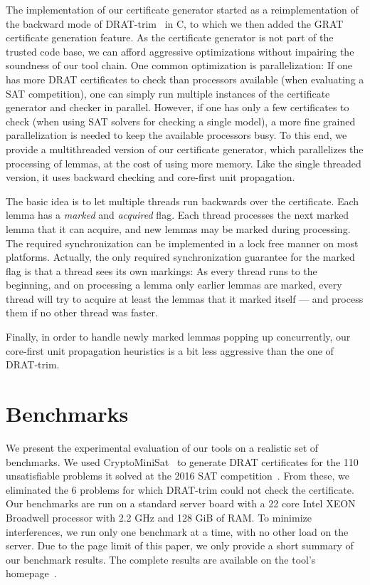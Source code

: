 \documentclass{llncs}
\newcommand\CC{C\nolinebreak[4]\hspace{-.05em}\raisebox{.4ex}{\relsize{-3}{\textbf{++}}}}
\begin{document}
The implementation of our certificate generator started as a reimplementation of the backward mode of DRAT-trim~\cite{WHH13,drat-trim-webpage} in \CC, to 
which we then added the GRAT certificate generation feature. 
As the certificate generator is not part of the trusted code base, we can afford aggressive optimizations without impairing the soundness of our tool chain.
One common optimization is parallelization: If one has more DRAT certificates to check than processors 
available (\eg when evaluating a SAT competition), one can simply run multiple instances of the certificate generator and checker in parallel.
However, if one has only a few certificates to check (\eg when using SAT solvers for checking a single model), a more fine grained parallelization 
is needed to keep the available processors busy. To this end, we provide a multithreaded version of our certificate generator, 
which parallelizes the processing of lemmas, at the cost of using more memory. Like the single threaded version, it uses backward checking and 
core-first unit propagation.

The basic idea is to let multiple threads run backwards over the certificate. Each lemma has a \emph{marked} and \emph{acquired} flag. 
Each thread processes the next marked lemma that it can acquire, and new lemmas may be marked during processing.
The required synchronization can be implemented in a lock free manner on most platforms. 
Actually, the only required synchronization guarantee for the marked flag is that a thread sees its own markings:
As every thread runs to the beginning, 
and on processing a lemma only earlier lemmas are marked, every thread will try to acquire at least the lemmas that it marked itself --- and 
process them if no other thread was faster. 

Finally, in order to handle newly marked lemmas popping up concurrently, our 
core-first unit propagation heuristics is a bit less aggressive than the one of DRAT-trim.

\section{Benchmarks}\label{sec:benchmarks}
We present the experimental evaluation of our tools on a realistic set of benchmarks.
We used CryptoMiniSat~\cite{SNC09,SATCOMP16} to generate DRAT certificates for the 110 unsatisfiable problems it solved at the 2016 SAT competition~\cite{satcomp-2016}.
From these, we eliminated the 6 problems for which DRAT-trim could not check the certificate.
Our benchmarks are run on a standard server board with a 22 core Intel XEON Broadwell processor with 2.2 GHz and 128 GiB of RAM.
To minimize interferences, we run only one benchmark at a time, with no other load on the server. 
Due to the page limit of this paper, we only provide a short summary of our benchmark results. The complete results are available on the tool's homepage~\cite{??}.
\end{document}

